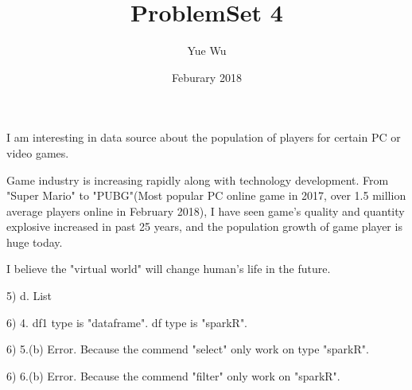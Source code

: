 \documentclass{article}
\title{ProblemSet 4}
\author{Yue Wu}
\date{Feburary 2018}
\begin{document}
\maketitle


I am interesting in data source about the population of players for certain PC or video games. 

Game industry is increasing rapidly along with technology development. From "Super Mario" to "PUBG"(Most popular PC online game in 2017, over 1.5 million average players online in February 2018), I have seen game's quality and quantity explosive increased in past 25 years, and the population growth of game player is huge today. 

I believe the "virtual world" will change human's life in the future.

5) d. List

6) 4. df1 type is "dataframe".
      df  type is "sparkR".

6) 5.(b) Error. Because the commend "select" only work on type "sparkR".

6) 6.(b) Error. Because the commend "filter" only work on "sparkR".
\end{document}
